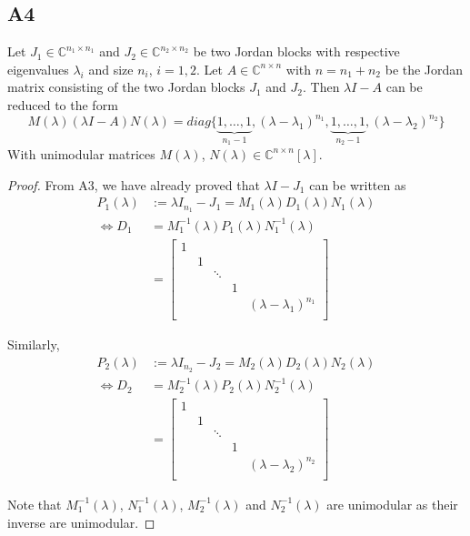 \documentclass[11pt]{article}
\begin{document}
\subsection*{A4}
Let $J_1 \in \mathbb{C}^{n_1 \times n_1}$ and $J_2 \in \mathbb{C}^{n_2 \times n_2}$ be two Jordan blocks with respective eigenvalues $\lambda_i$ and size $n_i$, $i = 1,2$. Let $A\in \mathbb{C}^{n\times n}$ with $n = n_1+n_2$ be the Jordan matrix consisting of the two Jordan blocks $J_1$ and $J_2$. Then $\lambda I - A$ can be reduced to the form
\[
M(\lambda) (\lambda I-A)N(\lambda) = diag\{\underbrace{1, \dots , 1}_{n_1 - 1}, (\lambda - \lambda_1)^{n_1}, \underbrace{1, \dots, 1}_{n_2 - 1}, (\lambda - \lambda_2)^{n_2}\}
\]
With unimodular matrices  $M(\lambda)$, $N(\lambda) \in \mathbb{C}^{n\times n}[\lambda]$.

\begin{proof}
From A3, we have already proved that $\lambda I - J_1$ can be written as
\begin{align*}
P_1(\lambda) &:= \lambda I_{n_1} - J_1 = M_1(\lambda) D_1(\lambda) N_1(\lambda)\\
\Leftrightarrow D_1 &= M_1^{-1}(\lambda)P_1(\lambda) N_1^{-1}(\lambda)\\
&= \begin{bmatrix}
1 & & & &\\
  &1& & &\\
  & &\ddots& &\\
  & & & 1& \\
  & & &  &(\lambda - \lambda_1)^{n_1}\\
\end{bmatrix}
\end{align*} 

Similarly, 
\begin{align*}
P_2(\lambda) &:= \lambda I_{n_2} - J_2 = M_2(\lambda) D_2(\lambda) N_2(\lambda)\\
\Leftrightarrow D_2 &= M_2^{-1}(\lambda)P_2(\lambda) N_2^{-1}(\lambda)\\
&= \begin{bmatrix}
1 & & & &\\
  &1& & &\\
  & &\ddots& &\\
  & & & 1& \\
  & & &  &(\lambda - \lambda_2)^{n_2}\\
\end{bmatrix}
\end{align*}

Note that $M_1^{-1}(\lambda)$, $N_1^{-1}(\lambda)$, $M_2^{-1}(\lambda)$ and $N_2^{-1}(\lambda)$ are unimodular as their inverse are unimodular.


\end{proof}
\end{document}
